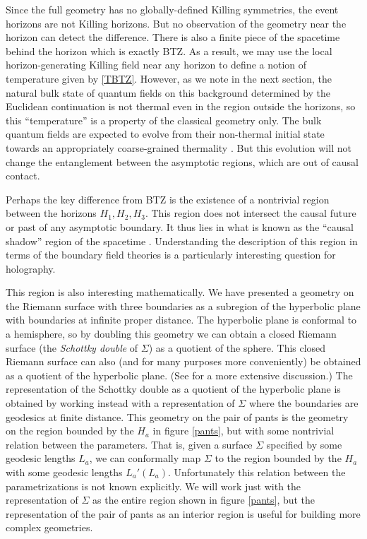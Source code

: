 \documentclass[12pt]{article}
\numberwithin{equation}{section}
\begin{document}
Since the full geometry has no globally-defined Killing symmetries, the event horizons are not Killing horizons.  But no observation of the geometry near the horizon can detect the difference. There is also a finite piece of the spacetime behind the horizon which is exactly BTZ.  As a result, we may use the local horizon-generating Killing field near any horizon to define a notion of temperature given by \eqref{TBTZ}.     However, as we note in the next section,  the natural bulk state of quantum fields on this background determined by the Euclidean continuation is not thermal even in the region outside the horizons, so this ``temperature'' is a property of the classical geometry only. The bulk quantum fields are expected to evolve from their non-thermal initial state towards an appropriately coarse-grained thermality \cite{Louko:1998dj}.  But this evolution will not change the entanglement between the asymptotic regions, which are out of causal contact.


Perhaps the key difference from BTZ is the existence of a nontrivial region between the horizons $H_1,H_2,H_3$.  This region does not intersect the causal future or past of any asymptotic boundary.  It thus lies in what is known as the ``causal shadow'' region of the spacetime \cite{MVM}.  Understanding the description of this region in terms of the boundary field theories is a particularly interesting question for holography.

This region is also interesting mathematically. We have presented a geometry on the Riemann surface with three boundaries as a subregion of the hyperbolic plane with boundaries at  infinite proper distance. The hyperbolic plane is conformal to a hemisphere, so by doubling this geometry we can obtain a closed Riemann surface (the {\it Schottky double} of $\Sigma$) as a quotient of the sphere. This closed Riemann surface can also (and for many purposes more conveniently) be obtained as a quotient of the hyperbolic plane. (See \cite{Krasnov:2000zq, Skenderis:2009ju} for a more extensive discussion.)  The representation of the Schottky double as a quotient of the hyperbolic plane is obtained by working instead with a representation of $\Sigma$  where the boundaries are geodesics at finite distance. This geometry on the pair of pants is the geometry on the region bounded by the $H_a$ in figure \ref{pants}, but with some nontrivial relation between the parameters. That is, given a surface $\Sigma$ specified by some geodesic lengths $L_a$, we can conformally map $\Sigma$ to the region bounded by the $H_a$ with some geodesic lengths $L_a'(L_a)$. Unfortunately this relation between the parametrizations  is not known explicitly. We will work just with the representation of $\Sigma$ as the entire region shown in figure \ref{pants}, but the representation of the pair of pants as an interior region is useful for building more complex geometries.
\end{document}
